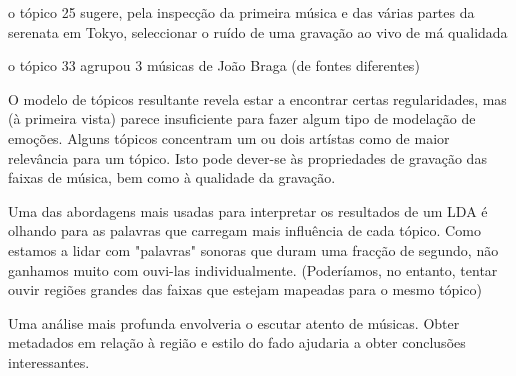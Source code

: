 \documentclass[11pt]{article}
\begin{document}
o tópico 25 sugere, pela inspecção da primeira música e das várias
partes da serenata em Tokyo, seleccionar o ruído de uma gravação ao vivo
de má qualidada

o tópico 33 agrupou 3 músicas de João Braga (de fontes diferentes)

    O modelo de tópicos resultante revela estar a encontrar certas
regularidades, mas (à primeira vista) parece insuficiente para fazer
algum tipo de modelação de emoções. Alguns tópicos concentram um ou dois
artístas como de maior relevância para um tópico. Isto pode dever-se às
propriedades de gravação das faixas de música, bem como à qualidade da
gravação.

    Uma das abordagens mais usadas para interpretar os resultados de um LDA
é olhando para as palavras que carregam mais influência de cada tópico.
Como estamos a lidar com "palavras" sonoras que duram uma fracção de
segundo, não ganhamos muito com ouvi-las individualmente. (Poderíamos,
no entanto, tentar ouvir regiões grandes das faixas que estejam mapeadas
para o mesmo tópico)

    Uma análise mais profunda envolveria o escutar atento de músicas. Obter
metadados em relação à região e estilo do fado ajudaria a obter
conclusões interessantes.


    
    
    
    
\end{document}
